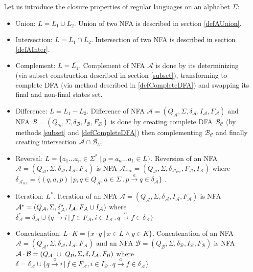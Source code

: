 		Let us introduce the closure properties of regular languages on an alphabet $\Sigma$:
		\begin{itemize}
			\item Union:  $L=L_1 \cup L_2$. Union of two NFA is described in section \ref{defAUnion}.
			\item Intersection:  $L=L_1 \cap L_2$. Intersection of two NFA is described in section \ref{defAInter}.
			\item Complement: $L=\overline{L_1}$.
      Complement of NFA $\mathcal{A}$ is done by its determinizing (via subset construction described in section \ref{subset}),
      transforming to complete DFA (via method described in \ref{defCompleteDFA}) and swapping its final and non-final states set.

      \item Difference: $L=L_1-L_2$. Difference of NFA $\mathcal{A}=(Q_\mathcal{A},\Sigma,\delta_\mathcal{A},I_\mathcal{A},F_\mathcal{A})$ 
      and NFA $\mathcal{B}=(Q_\mathcal{B},\Sigma,\delta_\mathcal{B},I_\mathcal{B},F_\mathcal{B})$ is done by creating
      complete DFA $\mathcal{B_C}$ (by methods \ref{subset} and \ref{defCompleteDFA}) then complementing $\mathcal{B_C}$ and
      finally creating intersection $\mathcal{A}\cap\overline{\mathcal{B_C}}$.

			\item Reversal: $L=\{a_1\dots a_n \in \Sigma^{*} \ |\ y=a_n\dots a_1 \in L\}$.
      Reversion of an NFA $\mathcal{A}=(Q_\mathcal{A},\Sigma,\delta_\mathcal{A},I_\mathcal{A},F_\mathcal{A})$ is
      NFA $\mathcal{A}_{rev}=(Q_{\mathcal{A}},\Sigma,\delta_{\mathcal{A}_{rev}},F_{\mathcal{A}},I_{\mathcal{A}})$ 
      where $\delta_{\mathcal{A}_{rev}}=\{(q,a,p)\,|\,p,q \in Q_\mathcal{A}, a \in \Sigma\,.\,p\xrightarrow{a}q\in\delta_{\mathcal{A}}\}$ .

      \item Iteration: $L^{*}$.
      Iteration of an NFA $\mathcal{A}=(Q_\mathcal{A},\Sigma,\delta_\mathcal{A},I_\mathcal{A},F_\mathcal{A})$ 
      is NFA $\mathcal{A}^{*}=(Q_\mathcal{A},\Sigma,\delta_\mathcal{A}^{*},I_\mathcal{A},\\F_\mathcal{A}\cup I_\mathcal{A})$ 
      where $\delta_\mathcal{A}^{*}=\delta_\mathcal{A}\cup
      \{q\xrightarrow{a}i\,|\,f\in F_\mathcal{A},i\in I_\mathcal{A}\,.\,q\xrightarrow{a}f \in \delta_\mathcal{A}\}$

			\item Concatenation: $L\cdot K=\{x \cdot y\ |\ x\in L \wedge y\in K\}$.
      Concatenation of an NFA $\mathcal{A}=(Q_\mathcal{A},\Sigma,\delta_\mathcal{A},I_\mathcal{A},F_\mathcal{A})$ and an NFA 
      $\mathcal{B}=(Q_\mathcal{B},\Sigma,\delta_\mathcal{B},I_\mathcal{B},F_\mathcal{B})$ is 
      NFA $\mathcal{A}\cdot\mathcal{B}=(Q_\mathcal{A}~\cup~Q_\mathcal{B},\Sigma,\delta,\\I_\mathcal{A},F_\mathcal{B})$ where $\delta=\delta_\mathcal{A} \cup
      \{q\xrightarrow{a}i\,|\,f\in F_\mathcal{A},i\in I_\mathcal{B}\,.\,q\xrightarrow{a}f \in \delta_\mathcal{A}\}$

  \end{itemize}

